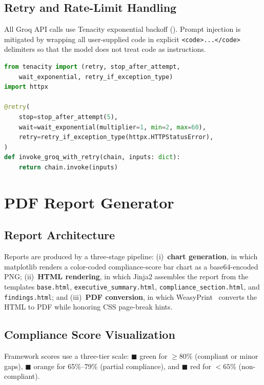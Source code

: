 \documentclass[conference]{IEEEtran}
\begin{document}
\subsection{Retry and Rate-Limit Handling}
All Groq API calls use Tenacity exponential backoff (). Prompt
injection is mitigated by wrapping all user-supplied code in explicit
\texttt{<code>...</code>} delimiters so that the model does not treat code as
instructions.

\begin{lstlisting}[language=Python, label={lst:retry},
  caption={Tenacity retry decorator for Groq API calls.}]
from tenacity import (retry, stop_after_attempt,
    wait_exponential, retry_if_exception_type)
import httpx

@retry(
    stop=stop_after_attempt(5),
    wait=wait_exponential(multiplier=1, min=2, max=60),
    retry=retry_if_exception_type(httpx.HTTPStatusError),
)
def invoke_groq_with_retry(chain, inputs: dict):
    return chain.invoke(inputs)
\end{lstlisting}

\section{PDF Report Generator}
\label{sec:report}

\subsection{Report Architecture}
Reports are produced by a three-stage pipeline: (i)~\textbf{chart generation}, in
which matplotlib renders a color-coded compliance-score bar chart as a
base64-encoded PNG; (ii)~\textbf{HTML rendering}, in which Jinja2 assembles the
report from the templates \texttt{base.html}, \texttt{executive\_summary.html},
\texttt{compliance\_section.html}, and \texttt{findings.html}; and
(iii)~\textbf{PDF conversion}, in which WeasyPrint~\cite{weasyprint} converts the
HTML to PDF while honoring CSS page-break hints.

\subsection{Compliance Score Visualization}
Framework scores use a three-tier scale: \textcolor{TLGreen}{$\blacksquare$}
green for $\geq 80\%$ (compliant or minor gaps),
\textcolor{TLOrange}{$\blacksquare$} orange for 65\%--79\% (partial compliance),
and \textcolor{TLRed}{$\blacksquare$} red for $<65\%$ (non-compliant).
\end{document}
